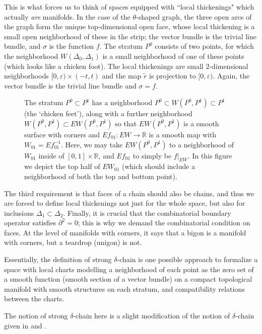 \documentclass[10pt,a4paper]{amsart}
\theoremstyle{definition}
\theoremstyle{remark}
\numberwithin{figure}{qchap}
\begin{document}
This is what forces us to think of spaces equipped with ``local thickenings" which actually \emph{are} manifolds. In the case of the $\theta$-shaped graph, the three open arcs of the graph form the unique top-dimensional open face, whose local thickening is a small open neighborhood of these in the strip; the vector bundle is the trivial line bundle, and $\sigma$ is the function $f$. The stratum $P^0$ consists of two points, for which the neighborhood $W(\Delta_0, \Delta_1)$ is a small neighborhood of one of these points (which looks like a chicken foot). The local thickenings are small 2-dimensional neighborhoods $[0,\varepsilon) \times (-t,t)$ and the map $\tilde r$ is projection to $[0,\varepsilon)$. Again, the vector bundle is the trivial line bundle and $\sigma = f$.

\begin{figure}[h]
    \centering
    
    \caption{The stratum $P^0 \subset P^1$ has a neighborhood $P^0 \subset W(P^0, P^1) \subset P^1$ (the `chicken feet'), along with a further neighborhood $W(P^0, P^1) \subset EW(P^0, P^1)$ so that $EW(P^0, P^1)$ is a smooth surface with corners and $Ef_{01}: EW \to \mathbb R$ is a smooth map with $W_{01} = Ef_{01}^{-1}$. Here, we may take $EW(P^0, P^1)$ to a neighborhood of $W_{01}$ inside of $[0,1] \times \mathbb R$, and $Ef_{01}$ to simply be $f|_{EW}$. In this figure we depict the top half of $EW_{01}$ (which should include a neighborhood of both the top and bottom point).}
    \label{fig:2}
\end{figure}

The third requirement is that faces of a chain should also be chains, and thus we are forced to define local thickenings not just for the whole space, but also for inclusions $\Delta_1 \subset \Delta_2$. 
Finally, it is crucial that the combinatorial boundary operator satisfies $\partial^2 = 0$; this is why we demand the combinatorial condition on faces. At the level of manifolds with corners, it says that a bigon is a manifold with corners, but a teardrop (unigon) is not.

Essentially, the definition of strong $\delta$-chain is one possible approach to formalize a space with local charts modelling a neighborhood of each point as the zero set of a smooth function (smooth section of a vector bundle) on a compact topological manifold with smooth structures on each stratum, and compatibility relations between the charts.

The notion of strong $\delta$-chain here is a slight modification of the notion of $\delta$-chain given in \cite[Definition~24.7.1]{KMSW} and \cite[Definition~4.1.1]{Lin}. 
\end{document}
